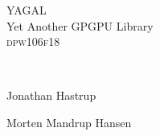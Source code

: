 \documentclass[pdftex,12pt,a4paper]{report}
\begin{document}
\begin{titlepage}
\begin{center}



{ \huge{YAGAL\\[0.7cm]Yet Another GPGPU Library} }
\\[1.5cm]

\textsc{dpw106f18}

\begin{figure}[!h]
	\centering
\end{figure}


\textsc{\Large }\\[0.5cm]

\begin{minipage}{0.46\textwidth}
\begin{flushleft} \large
Jonathan Hastrup\\
\end{flushleft}
\end{minipage}
\begin{minipage}{0.45\textwidth}
\begin{flushright} \large
Morten Mandrup Hansen\\
\end{flushright}
\end{minipage}

\vfill

\end{center}
\end{titlepage}
\end{document}
